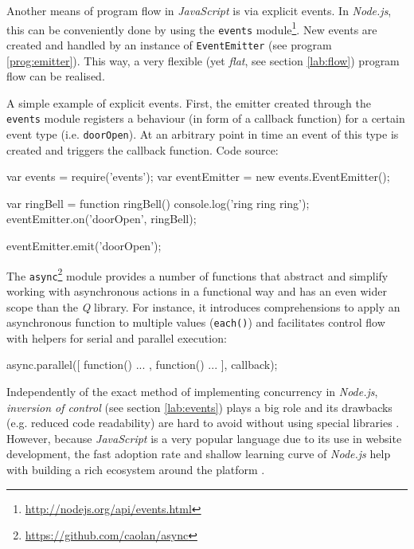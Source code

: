 Another means of program flow in \textit{JavaScript} is via explicit events. In \textit{Node.js}, this can be conveniently done by using the \texttt{events} module\footnote{\url{http://nodejs.org/api/events.html}}. New events are created and handled by an instance of \texttt{EventEmitter} (see program \ref{prog:emitter}). This way, a very flexible (yet \textit{flat}, see section \ref{lab:flow}) program flow can be realised.

\begin{program}
  \caption{A simple example of explicit events. First, the emitter created through the \texttt{events} module registers a behaviour (in form of a callback function) for a certain event type (i.e. \texttt{doorOpen}). At an arbitrary point in time an event of this type is created and triggers the callback function. Code source: \cite{Cogneau2013}}
  \label{prog:emitter}
  \begin{JavaCode}
var events = require('events');
var eventEmitter = new events.EventEmitter();
 
var ringBell = function ringBell()
{
    console.log('ring ring ring');
}
eventEmitter.on('doorOpen', ringBell);
 
eventEmitter.emit('doorOpen');
  \end{JavaCode}
\end{program}

The \texttt{async}\footnote{\url{https://github.com/caolan/async}} module provides a number of functions that abstract and simplify working with asynchronous actions in a functional way and has an even wider scope than the \textit{Q} library. For instance, it introduces comprehensions to apply an asynchronous function to multiple values (\texttt{each()}) and facilitates control flow with helpers for serial and parallel execution:

\begin{JavaCode}
async.parallel([
    function(){ ... },
    function(){ ... }
], callback);
\end{JavaCode}

Independently of the exact method of implementing concurrency in \textit{Node.js}, \textit{inversion of control} (see section \ref{lab:events}) plays a big role and its drawbacks (e.g. reduced code readability) are hard to avoid without using special libraries \cite[p. 93]{Erb2012}. However, because \textit{JavaScript} is a very popular language due to its use in website development, the fast adoption rate and shallow learning curve of \textit{Node.js} help with building a rich ecosystem around the platform \cite[p. 27]{Hughes-Croucher2012}.

